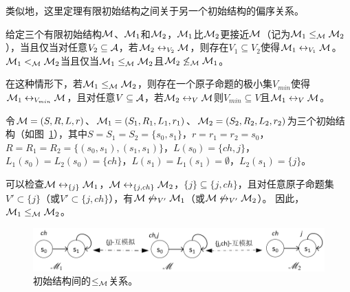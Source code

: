 类似地，这里定理有限初始结构之间关于另一个初始结构的偏序关系。
\begin{definition}\label{def:closer}
	给定三个有限初始结构${\cal M}$、${\cal M}_1$和${\cal M}_2$，${\cal M}_1$比${\cal M}_2$更接近${\cal M}$（记为${\cal M}_1 \leq_{{\cal M}} {\cal M}_2$），当且仅当对任意$V_2 \subseteq \mathcal{A}$，若${\cal M}_2 \leftrightarrow_{V_2} {\cal M}$，则存在$V_1 \subseteq V_2$使得${\cal M}_1 \leftrightarrow_{V_1} {\cal M}$。
	${\cal M}_1 <_{{\cal M}} {\cal M}_2$当且仅当${\cal M}_1 \leq_{{\cal M}} {\cal M}_2$且${\cal M}_2 \not \leq_{{\cal M}} {\cal M}_1$。
\end{definition}

在这种情形下，若${\cal M}_1 \leq_{{\cal M}} {\cal M}_2$，则存在一个原子命题的极小集$V_{min}$使得${\cal M}_1 \leftrightarrow_{V_{min}} {\cal M}$，且对任意$V\subseteq {\cal A}$，若${\cal M}_2 \leftrightarrow_V {\cal M}$则$V_{min}\subseteq V$且${\cal M}_1 \leftrightarrow_V {\cal M}$。
\begin{example}
	令${\cal M}= (S, R, L, r)$、${\cal M}_1 = (S_1, R_1, L_1, r_1)$、${\cal M}_2 = (S_2, R_2, L_2, r_2)$为三个初始结构（如图~\ref{fig:partialo}），其中$S = S_1 = S_2 = \{s_0, s_1\}$，$r=r_1=r_2= s_0$，$R=R_1=R_2=\{(s_0, s_1), (s_1, s_1)\}$，$L(s_0) = \{ch, j\}$，$L_1(s_0) = L_2(s_0) = \{ch\}$，$L(s_1) = L_1(s_1)=\emptyset$，$L_2(s_1) = \{j\}$。
	
	可以检查${\cal M} \leftrightarrow_{\{j\}} {\cal M}_1$，${\cal M} \leftrightarrow_{\{j,ch\}} {\cal M}_2$，$\{j\}\subseteq \{j,ch\}$，且对任意原子命题集$V' \subset \{j\}$（或$V' \subset \{j,ch\}$），有${\cal M} \not\leftrightarrow_{V'} {\cal M}_1$（或${\cal M} \not \leftrightarrow_{V'} {\cal M}_2$）。
	因此，${\cal M}_1 \leq_{{\cal M}} {\cal M}_2$。
	\begin{figure}[h]%
		\centering
		\includegraphics[width=12cm]{figures/chapter06/partial_order2.png}
		\caption{初始结构间的$\leq_{{\cal M}}$关系。}\label{fig:partialo}
		
	\end{figure}
\end{example}

